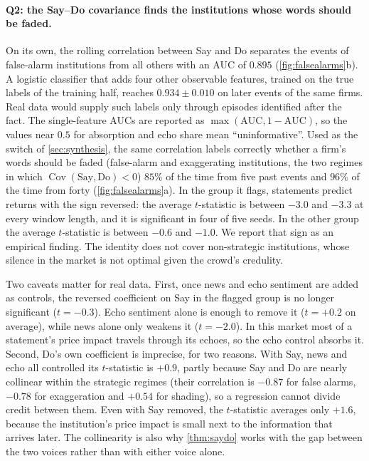 \documentclass[11pt,a4paper]{article}
\theoremstyle{plain}
\theoremstyle{definition}
\theoremstyle{remark}
\DeclareMathOperator{\Cov}{Cov}
\begin{document}
\paragraph{Q2: the Say--Do covariance finds the institutions whose words should be faded.} On its own, the rolling correlation between Say and Do separates the events of false-alarm institutions from all others with an AUC of $0.895$ (\cref{fig:falsealarms}b). A logistic classifier that adds four other observable features, trained on the true labels of the training half, reaches $0.934\pm0.010$ on later events of the same firms. Real data would supply such labels only through episodes identified after the fact. The single-feature AUCs are reported as $\max(\text{AUC},1-\text{AUC})$, so the values near $0.5$ for absorption and echo share mean ``uninformative''. Used as the switch of \cref{sec:synthesis}, the same correlation labels correctly whether a firm's words should be faded (false-alarm and exaggerating institutions, the two regimes in which $\Cov(\text{Say},\text{Do})<0$) $85\%$ of the time from five past events and $96\%$ of the time from forty (\cref{fig:falsealarms}a). In the group it flags, statements predict returns with the sign reversed: the average $t$-statistic is between $-3.0$ and $-3.3$ at every window length, and it is significant in four of five seeds. In the other group the average $t$-statistic is between $-0.6$ and $-1.0$. We report that sign as an empirical finding. The identity does not cover non-strategic institutions, whose silence in the market is not optimal given the crowd's credulity.

Two caveats matter for real data. First, once news and echo sentiment are added as controls, the reversed coefficient on Say in the flagged group is no longer significant ($t=-0.3$). Echo sentiment alone is enough to remove it ($t=+0.2$ on average), while news alone only weakens it ($t=-2.0$). In this market most of a statement's price impact travels through its echoes, so the echo control absorbs it. Second, Do's own coefficient is imprecise, for two reasons. With Say, news and echo all controlled its $t$-statistic is $+0.9$, partly because Say and Do are nearly collinear within the strategic regimes (their correlation is $-0.87$ for false alarms, $-0.78$ for exaggeration and $+0.54$ for shading), so a regression cannot divide credit between them. Even with Say removed, the $t$-statistic averages only $+1.6$, because the institution's price impact is small next to the information that arrives later. The collinearity is also why \cref{thm:saydo} works with the gap between the two voices rather than with either voice alone.
\end{document}
